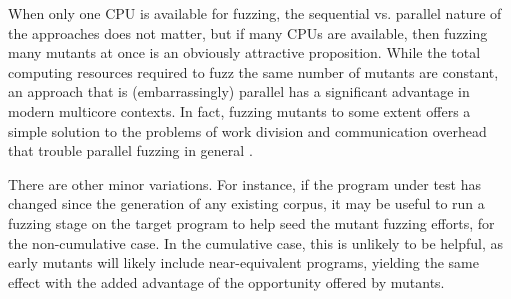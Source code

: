 When only one CPU is available for fuzzing, the sequential vs. parallel nature
of the approaches does not matter, but if many CPUs are available,
then fuzzing many mutants at once is an obviously attractive proposition.
While the total computing resources required to fuzz the same number of mutants
are constant, an approach that is (embarrassingly) parallel has a significant
advantage in modern multicore contexts.
In fact, fuzzing mutants to some extent offers a simple solution to the problems
of work division and communication overhead that trouble parallel fuzzing in
general \cite{wang2021facilitating}.

There are other minor variations.  For instance, if the program under
test has changed since the generation of any existing corpus, it may
be useful to run a fuzzing stage on the target program to help seed
the mutant fuzzing efforts, for the non-cumulative case.  In the
cumulative case, this is unlikely to be helpful, as early mutants will
likely include near-equivalent programs, yielding the same effect with the added advantage of the opportunity offered by mutants.
